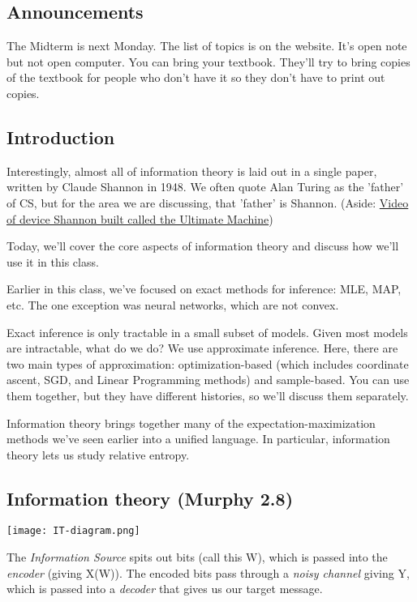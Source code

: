 \documentclass{article}
\begin{document}

\subsection{Announcements}
The Midterm is next Monday. The list of topics is on the website. It's open note but not open computer. You can bring your textbook. They'll try to bring copies of the textbook for people who don't have it so they don't have to print out copies. 

\subsection{Introduction}
Interestingly, almost all of information theory is laid out in a single paper, written by Claude Shannon in 1948. We often quote Alan Turing as the 'father' of CS, but for the area we are discussing, that 'father' is Shannon. (Aside: \href{https://www.youtube.com/watch?v=cZ34RDn34Ws}{Video of device Shannon built called the Ultimate Machine})

\smallskip
Today, we'll cover the core aspects of information theory and discuss how we'll use it in this class.

\smallskip
Earlier in this class, we've focused on exact methods for inference: MLE, MAP, etc. The one exception was neural networks, which are not convex.

\smallskip
Exact inference is only tractable in a small subset of models. Given most models are intractable, what do we do? We use approximate inference. Here, there are two main types of approximation:  optimization-based (which includes coordinate ascent, SGD, and Linear Programming methods) and sample-based. You can use them together, but they have different histories, so we'll discuss them separately. 

\smallskip
Information theory brings together many of the expectation-maximization methods we've seen earlier into a unified language. In particular, information theory lets us study relative entropy.

\subsection{Information theory (Murphy 2.8)}
\begin{center}
\texttt{[image: IT-diagram.png]}
\end{center}
The \textit{Information Source} spits out bits (call this W), which is passed into the \textit{encoder} (giving X(W)). The encoded bits pass through a \textit{noisy channel} giving Y, which is passed into a \textit{decoder} that gives us our target message.
\end{document}
